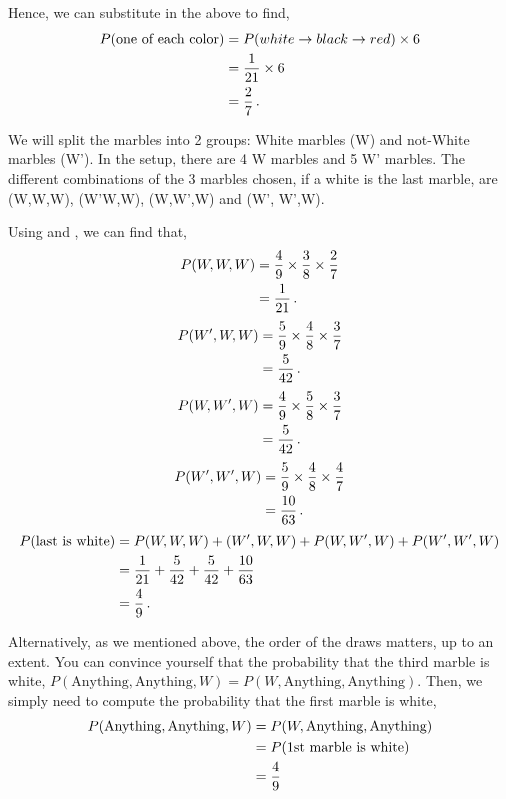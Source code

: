 \begin{subquestions}
\begin{subsubquestions}
Hence, we can substitute in the above to find,
\begin{align}
	P(\text{one of each color}) & = P(white \rightarrow black \rightarrow red) \times 6 \nonumber \\
	                     & = \frac{1}{21} \times 6 \nonumber \\
	                     & = \frac{2}{7} \,.
\end{align}



\subsubquestion

We will split the marbles into 2 groups: White marbles (W) and not-White marbles (W'). In the setup, there are 4 W marbles and 5 W' marbles. The different combinations of the 3 marbles chosen, if a white is the last marble, are (W,W,W), (W'W,W), (W,W',W) and (W', W',W). 

Using  and , we can find that,
\begin{align}
	P(W,W,W) & = \frac{4}{9} \times \frac{3}{8} \times \frac{2}{7} \nonumber \\
	         & = \frac{1}{21} \,.
\end{align}
\begin{align}
	P(W',W,W) & = \frac{5}{9} \times \frac{4}{8} \times \frac{3}{7} \nonumber \\
              & = \frac{5}{42} \,.
\end{align}
\begin{align}
	P(W,W',W) & = \frac{4}{9} \times \frac{5}{8} \times \frac{3}{7} \nonumber \\
			  & = \frac{5}{42} \,. 
\end{align}
\begin{align}
	P(W',W',W)& = \frac{5}{9} \times \frac{4}{8} \times \frac{4}{7} \nonumber \\
			  & = \frac{10}{63} \,.
\end{align}
\begin{align}
	P(\text{last is white}) & = P(W,W,W)+(W',W,W)+P(W,W',W)+P(W',W',W) \nonumber \\
	& = \frac{1}{21} + \frac{5}{42} + \frac{5}{42} + \frac{10}{63} \nonumber \\
	                               & = \frac{4}{9} \,.
\end{align}

Alternatively, as we mentioned above, the order of the draws matters, up to an extent. You can convince yourself that the probability that the third marble is white, $P(\text{Anything},\text{Anything},W) =P(W,\text{Anything},\text{Anything})$. Then, we simply need to compute the probability that the first marble is white,
\begin{align}
	P(\text{Anything},\text{Anything},W) &=P(W,\text{Anything},\text{Anything}) \nonumber\\
	&= P(\text{1st marble is white}) \nonumber\\
	&= \frac{4}{9}
\end{align}

\end{subsubquestions}

\end{subquestions}